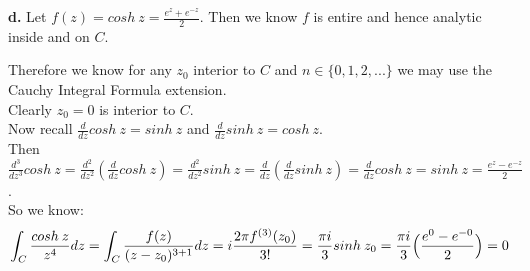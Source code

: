 \documentclass{article}
\begin{document}
{\Large\textbf{d.}} Let $f(z) = cosh\:z =\frac{e^z + e^{-z}}{2}$. Then we know $f$ is entire and hence analytic inside and on $C$.
\begin{center}
    \doublespacing
    Therefore we know for any $z_0$ interior to $C$ and $n\in\{0, 1, 2, ...\}$ we may use the Cauchy Integral Formula extension.
    \\Clearly $z_0 = 0$ is interior to $C$.
    \\Now recall $\frac{d}{dz} cosh\:z = sinh\:z$ and $\frac{d}{dz} sinh\:z = cosh\:z$.
    \\Then $\frac{d^3}{dz^3} cosh\:z =\frac{d^2}{dz^2} (\frac{d}{dz} cosh\:z) =\frac{d^2}{dz^2} sinh\:z =\frac{d}{dz} (\frac{d}{dz} sinh\:z) =\frac{d}{dz} cosh\:z = sinh\:z =\frac{e^z - e^{-z}}{2}$.
    \\So we know:
    \[\int _C\frac{cosh\:z}{z^4} dz =\int _C\frac{f(z)}{(z - z_0)^{3+1}} dz = i\frac{2\pi f^{(3)} (z_0)}{3!} =\frac{\pi i}{3} sinh\:z_0 =\frac{\pi i}{3}\Big{(}\frac{e^0 - e^{-0}}{2}\Big{)} = 0\]
    \qedsymbol
\end{center}


\newpage
\end{document}
